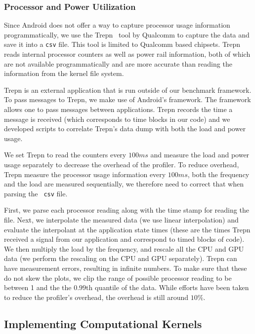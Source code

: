 \subsubsection{Processor and Power Utilization}

Since Android does not offer a way to capture processor usage information
programmatically, we use the Trepn~\cite{profilerqualcomm} tool by Qualcomm to capture the data and save it into a {\tt csv} file.
This tool is limited to Qualcomm based
chipsets. Trepn reads internal processor counters as well as power rail information,
both of which are not available programmatically and are more accurate than reading
the information from the  kernel file system.

Trepn is an external application that is run outside of our benchmark framework.
To pass messages to Trepn, we make use of Android's  framework.
The  framework allows one to pass messages between applications.
Trepn records the time a message is received (which corresponds to time blocks
in our code) and we developed scripts to correlate Trepn's data dump with both
the load and power usage.

We set Trepn to read
the counters every $100ms$ and measure the load and power usage separately to
decrease the overhead of the profiler.  To reduce overhead, Trepn measure the
processor usage information every $100ms$, both the frequency and the load are
measured sequentially, we therefore need to correct that when parsing the {\tt
csv} file.

First, we parse each processor reading along with the time stamp for reading the
file.  Next, we interpolate the measured data (we use linear interpolation) and
evaluate the interpolant at the application state times (these are the times
Trepn received a signal from our application and correspond to timed blocks of
code).  We then multiply the load by the frequency, and rescale all the CPU and
GPU data (we perform the rescaling on the CPU and GPU separately).  Trepn can
have measurement errors, resulting in infinite numbers.  To make sure that these
do not skew the plots, we clip the range of possible processor reading to be
between 1 and the the $0.99$th quantile of the data.  While efforts have
been taken to reduce the profiler's overhead, the overhead is still around
$10\%$.


\subsection{Implementing Computational Kernels}
\label{sec:implementationRS}

